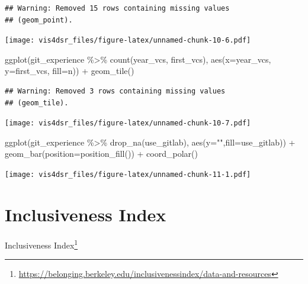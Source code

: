\documentclass[
]{krantz}
\makeatletter
\newenvironment{Shaded}{\begin{snugshade}}{\end{snugshade}}
\newcommand{\AttributeTok}[1]{\textcolor[rgb]{0.61,0.61,0.61}{#1}}
\newcommand{\FunctionTok}[1]{\textcolor[rgb]{0,0,0}{#1}}
\newcommand{\NormalTok}[1]{#1}
\newcommand{\SpecialCharTok}[1]{\textcolor[rgb]{0,0,0}{#1}}
\newcommand{\StringTok}[1]{\textcolor[rgb]{0.5,0.5,0.5}{#1}}
\renewcommand{\href}[2]{#2\footnote{\url{#1}}}
\newenvironment{kframe}{%
\medskip{}
\setlength{\fboxsep}{.8em}
 \def\at@end@of@kframe{}%
 \ifinner\ifhmode%
  \def\at@end@of@kframe{\end{minipage}}%
  \begin{minipage}{\columnwidth}%
 \fi\fi%
 \def\FrameCommand##1{\hskip\@totalleftmargin \hskip-\fboxsep
 \colorbox{shadecolor}{##1}\hskip-\fboxsep
     \hskip-\linewidth \hskip-\@totalleftmargin \hskip\columnwidth}%
 \MakeFramed {\advance\hsize-\width
   \@totalleftmargin\z@ \linewidth\hsize
   \@setminipage}}%
 {\par\unskip\endMakeFramed%
 \at@end@of@kframe}
\renewenvironment{Shaded}{\begin{kframe}}{\end{kframe}}
\makeatother
\begin{document}
\begin{verbatim}
## Warning: Removed 15 rows containing missing values
## (geom_point).
\end{verbatim}

\texttt{[image: vis4dsr\_files/figure-latex/unnamed-chunk-10-6.pdf]}

\begin{Shaded}
\begin{Highlighting}[]
\FunctionTok{ggplot}\NormalTok{(git\_experience }\SpecialCharTok{\%\textgreater{}\%} \FunctionTok{count}\NormalTok{(year\_vcs, first\_vcs), }
       \FunctionTok{aes}\NormalTok{(}\AttributeTok{x=}\NormalTok{year\_vcs, }\AttributeTok{y=}\NormalTok{first\_vcs, }\AttributeTok{fill=}\NormalTok{n)) }\SpecialCharTok{+}
  \FunctionTok{geom\_tile}\NormalTok{()}
\end{Highlighting}
\end{Shaded}

\begin{verbatim}
## Warning: Removed 3 rows containing missing values
## (geom_tile).
\end{verbatim}

\texttt{[image: vis4dsr\_files/figure-latex/unnamed-chunk-10-7.pdf]}

\begin{Shaded}
\begin{Highlighting}[]
\FunctionTok{ggplot}\NormalTok{(git\_experience }\SpecialCharTok{\%\textgreater{}\%} \FunctionTok{drop\_na}\NormalTok{(use\_gitlab), }\FunctionTok{aes}\NormalTok{(}\AttributeTok{y=}\StringTok{""}\NormalTok{,}\AttributeTok{fill=}\NormalTok{use\_gitlab)) }\SpecialCharTok{+}
  \FunctionTok{geom\_bar}\NormalTok{(}\AttributeTok{position=}\FunctionTok{position\_fill}\NormalTok{()) }\SpecialCharTok{+}
  \FunctionTok{coord\_polar}\NormalTok{()}
\end{Highlighting}
\end{Shaded}

\texttt{[image: vis4dsr\_files/figure-latex/unnamed-chunk-11-1.pdf]}

\hypertarget{inclusiveness-index}{%
\section*{Inclusiveness Index}\label{inclusiveness-index}}


\href{https://belonging.berkeley.edu/inclusivenessindex/data-and-resources}{Inclusiveness Index}
\end{document}
